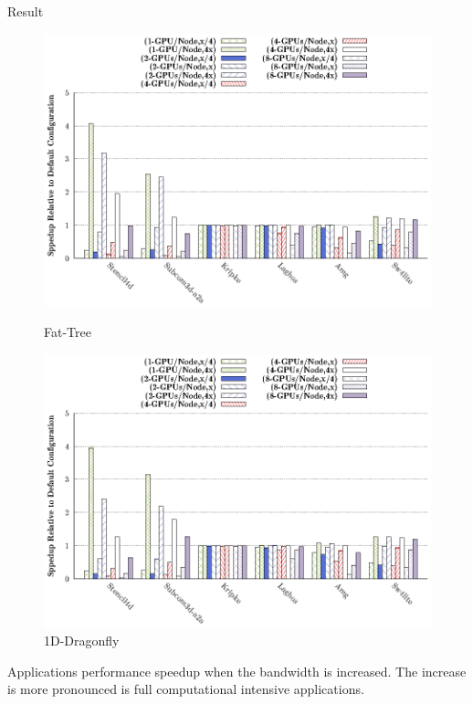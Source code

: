 \documentclass[final]{beamer}
\newlength{\sepwidth}
\newcommand{\separatorcolumn}{\begin{column}{\sepwidth}\end{column}}
\begin{document}
\begin{frame}[t]
\begin{columns}[t]
\begin{column}{0.5\textwidth}
\begin{block}{Result}
 \begin{figure}
\centering
\begin{minipage}[t][2cm][t]{.45\textwidth}
\centering
\includegraphics[width=1\linewidth]{figs/ftree-bw-mapping-all.eps}
\caption{Fat-Tree}
\label{fig:13a}
\end{minipage}
\separatorcolumn
\begin{minipage}[t][2cm][t]{.45\textwidth}
\centering
\includegraphics[width=1\linewidth]{figs/dfly-bw-mapping-all.eps}
\caption{1D-Dragonfly}
\label{fig:13b}
\end{minipage}
\end{figure}
Applications performance speedup when the bandwidth is increased.
\newline
The increase is more pronounced is full computational intensive applications.


\end{block}
\end{column}
\end{columns}
\end{frame}
\end{document}
